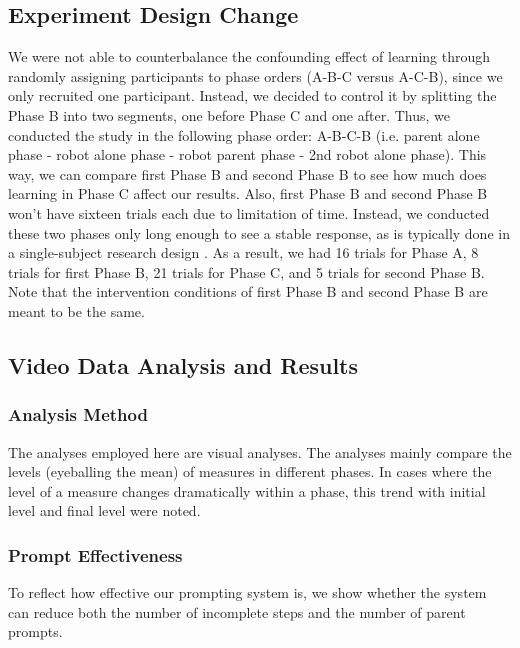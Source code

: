 \documentclass{ut-thesis}
\begin{document}
\subsection{Experiment Design Change}
We were not able to counterbalance the confounding effect of learning through randomly assigning participants to phase orders (A-B-C versus A-C-B), since we only recruited one participant.  Instead, we decided to control it by splitting the Phase B into two segments, one before Phase C and one after.  Thus, we conducted the study in the following phase order: A-B-C-B (i.e. parent alone phase - robot alone phase - robot parent phase - 2nd robot alone phase).  This way, we can compare first Phase B and second Phase B to see how much does learning in Phase C affect our results.  Also, first Phase B and second Phase B won't have sixteen trials each due to limitation of time.  Instead, we conducted these two phases only long enough to see a stable response, as is typically done in a single-subject research design \cite{ayres2009acquisition, bereznak2012video}.  As a result, we had 16 trials for Phase A, 8 trials for first Phase B, 21 trials for Phase C, and 5 trials for second Phase B.  Note that the intervention conditions of first Phase B and second Phase B are meant to be the same.


\subsection{Video Data Analysis and Results}
\label{sec:VideoDataAnalysisAndResults}

\subsubsection{Analysis Method}
The analyses employed here are visual analyses.  The analyses mainly compare the levels (eyeballing the mean) of measures in different phases.  In cases where the level of a measure changes dramatically within a phase, this trend with initial level and final level were noted.

\subsubsection{Prompt Effectiveness}
To reflect how effective our prompting system is, we show whether the system can reduce both the number of incomplete steps and the number of parent prompts.
\end{document}
